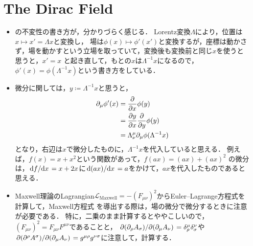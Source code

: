 \section{The Dirac Field}
\begin{itemize}
	\item {}の不変性の書き方が，分かりづらく感じる．
		Lorentz変換$\Lambda$により，位置は$x\mapsto x'= \Lambda x$と変換し，
		場は$\phi(x) \mapsto \phi'(x')$と変換するが，座標は動かさず，場を動かすという立場を取っていて，変換後も変換前と同じ$x$を使うと思うと，$x' = x$
		と起き直して，もとの$x$は$\Lambda^{-1}x$になるので，$\phi'(x)=\phi(\Lambda^{-1}x)$という書き方をしている．

	\item 微分に関しては，$y\coloneqq \Lambda^{-1}x$と思うと，
		\begin{align}
			\partial_{\mu}\phi'(x) &= \pdv{}{x}\phi(y)\\
								   &= \pdv{y}{x}\pdv{}{y}\phi(y)\\
								   &= \Lambda_{\nu}^{\mu}\partial_{\mu}\phi(\Lambda^{-1}x)
		\end{align}
		となり，右辺は$x$で微分したものに，$\Lambda^{-1}x$を代入していると思える．
		例えば，$f(x)= x + x^2$という関数があって，$f(ax) = (ax) + (ax)^2$
		の微分は，$\dv*{f}{x} = x+2x$に$\dv*{(ax)}{x}=a$をかけて，$ax$を代入したものであると思える．

	\item Maxwell理論のLagrangian$\mathcal{L}_{\text{Maxwell}} = -(F_{\mu\nu})^2$からEuler--Lagrange方程式を計算して，Maxwell方程式
		を導出する際は，場の微分で微分するときに注意が必要である．
		特に，二乗のまま計算するとややこしいので，$(F_{\mu\nu})^2=F_{\mu\nu}F^{\mu\nu}$であることと，
		$\pdv*{(\partial_{\rho}A_{\sigma})}{(\partial_{\mu}A_{\nu})} = \delta^{\mu}_{\rho}\delta^{\nu}_{\sigma}$や$\pdv*{(\partial^{\rho}A^{\sigma})}{(\partial_{\mu}A_{\nu})} = g^{\mu\rho}g^{\nu\sigma}$に注意して，計算する．


\end{itemize}
